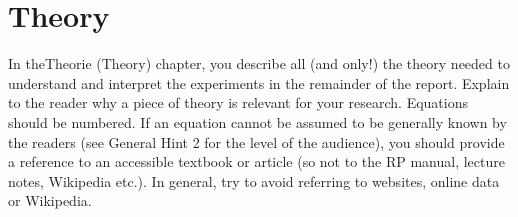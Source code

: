 \section{Theory}
In  theTheorie  (Theory)  chapter,  you  describe  all  (and  only!)  the  theory needed  to  understand  and  interpret the experiments  in  the  remainder  of  the  report.    Explain  to  the  reader  why  a  piece  of  theory  is  relevant  for  your  research.  Equations  should  be  numbered.  If  an  equation  cannot  be  assumed  to  be  generally known by the readers (see General Hint 2 for the level of the audience), you should provide a reference to an accessible textbook or article (so not to the RP manual, lecture notes, Wikipedia etc.). In general, try to avoid referring to websites, online data or Wikipedia.
